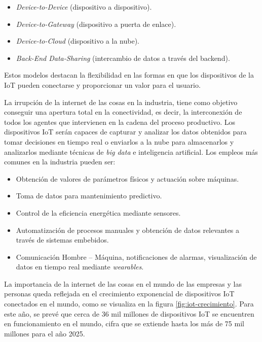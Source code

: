 \begin{itemize}
	\item \textit{Device-to-Device} (dispositivo a dispositivo).
	\item \textit{Device-to-Gateway} (dispositivo a puerta de enlace).
	\item \textit{Device-to-Cloud} (dispositivo a la nube).
	\item \textit{Back-End Data-Sharing} (intercambio de datos a través del backend).
\end{itemize}

Estos modelos destacan la flexibilidad en las formas en que los dispositivos de la IoT pueden conectarse y proporcionar un valor para el usuario.

La irrupción de la internet de las cosas en la industria, tiene como objetivo conseguir una apertura total en la conectividad, es decir, la interconexión de todos los agentes que intervienen en la cadena del proceso productivo. Los dispositivos IoT serán capaces de capturar y analizar los datos obtenidos para tomar decisiones en tiempo real o enviarlos a la nube para almacenarlos y analizarlos mediante técnicas de \textit{big data}  e inteligencia artificial. Los empleos más comunes en la industria pueden ser:
\begin{itemize}
	\item Obtención de valores de parámetros físicos y actuación sobre máquinas.
	\item Toma de datos para mantenimiento predictivo. 
	\item Control de la eficiencia energética mediante sensores.
	\item Automatización de procesos manuales y obtención de datos relevantes a través de sistemas embebidos.
	\item Comunicación Hombre – Máquina, notificaciones de alarmas, visualización de datos en tiempo real mediante \textit{wearables}.
\end{itemize}

La importancia de la internet de las cosas en el mundo de las empresas y las personas queda reflejada en el crecimiento exponencial de dispositivos IoT conectados en el mundo, como se visualiza en la figura  \ref{fig:iot-crecimiento}. Para este año, se prevé que cerca de 36 mil millones de dispositivos IoT se encuentren en funcionamiento en el mundo, cifra que se extiende hasta los más de 75 mil millones para el año 2025.

